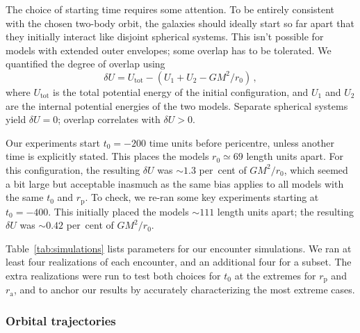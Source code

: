 \documentclass[fleqn,usenatbib]{mnras}
\begin{document}
The choice of starting time requires some attention. To be entirely consistent with the chosen two-body orbit, the galaxies should ideally start so far apart that they initially interact like disjoint spherical systems. This isn't possible for models with extended outer envelopes; some overlap has to be tolerated. We quantified the degree of overlap using
\begin{equation}
    \delta U = U_\mathrm{tot} - (U_{1} + U_{2} - G M^2 / r_{0}) \, ,
    \label{eq:deltaU}
\end{equation}
where $U_\mathrm{tot}$ is the total potential energy of the initial configuration, and $U_{1}$ and $U_{2}$ are the internal potential energies of the two models. Separate spherical systems yield $\delta U = 0$; overlap correlates with $\delta U > 0$.

Our experiments start $t_{0} = -200$ time units before pericentre, unless another time is explicitly stated. This places the models $r_{0} \simeq 69$ length units apart. For this configuration, the resulting $\delta U$ was $\sim 1.3$ per~cent of $G M^2 / r_{0}$, which seemed a bit large but acceptable inasmuch as the same bias applies to all models with the same $t_{0}$ and $r_\mathrm{p}$. To check, we re-ran some key experiments starting at $t_{0} = -400$. This initially placed the models $\sim 111$ length units apart; the resulting $\delta U$ was $\sim 0.42$ per~cent of $G M^2 / r_{0}$. 

Table~\ref{tab:simulations} lists parameters for our encounter simulations. We ran at least four realizations of each encounter, and an additional four for a subset. The extra realizations were run to test both choices for $t_{0}$ at the extremes for $r_\mathrm{p}$ and $r_\mathrm{a}$, and to anchor our results by accurately characterizing the most extreme cases.

\subsubsection{Orbital trajectories}
\label{orbital_trajectories}
\end{document}
